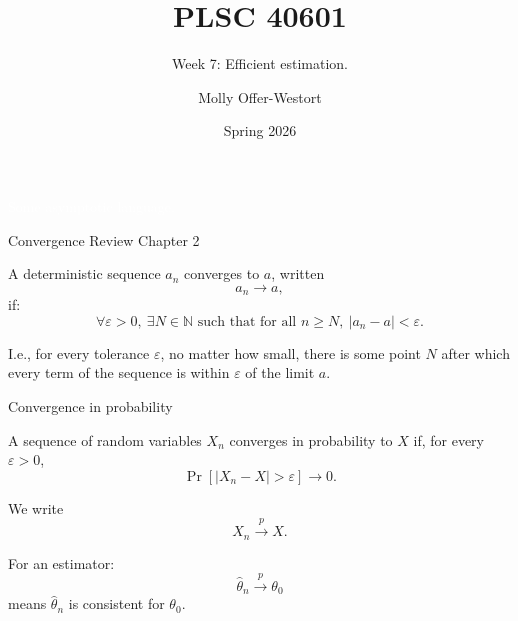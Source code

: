 \documentclass[xcolor={table}, handout]{beamer}
\title{PLSC 40601}
\subtitle{Week 7: Efficient estimation.}
\date{Spring 2026}
\author{Molly Offer-Westort}
\institute{Department of Political Science, \\University of Chicago}
\begin{document}
\frame{\titlepage
\thispagestyle{empty}
}
\begin{transitionframe}
\centering

\LARGE \textcolor{white}{Some asymptotic language.}

\end{transitionframe}

\note{
\scriptsize \singlespacing

}
\begin{frame}{Convergence}
Review \cite{lehmann1999elements} Chapter 2
\vskip 0.2cm

\begin{wideitemize}
\item A deterministic sequence $a_n$ converges to $a$, written
\[
a_n\rightarrow a,
\]
if:
\[
\forall \varepsilon>0,\ \exists N\in\mathbb{N}
\text{ such that for all } n\geq N,\ |a_n-a|<\varepsilon.
\]\pause
\item I.e., for every tolerance $\varepsilon$, no matter how small, there is some point $N$ after which every term of the sequence is within $\varepsilon$ of the limit $a$.
\end{wideitemize}

\end{frame}

\note{
\scriptsize \singlespacing

}
\begin{frame}{Convergence in probability}

\begin{wideitemize}
\item A sequence of random variables $X_n$ converges in probability to $X$ if, for every $\varepsilon>0$,
\[
\Pr[|X_n-X|>\varepsilon]\rightarrow 0.
\]\pause
\item We write
\[
X_n \overset{p}{\rightarrow} X.
\]\pause
\item For an estimator:
\[
\hat\theta_n \overset{p}{\rightarrow} \theta_0
\]
means $\hat\theta_n$ is consistent for $\theta_0$.
\end{wideitemize}

\end{frame}
\end{document}
